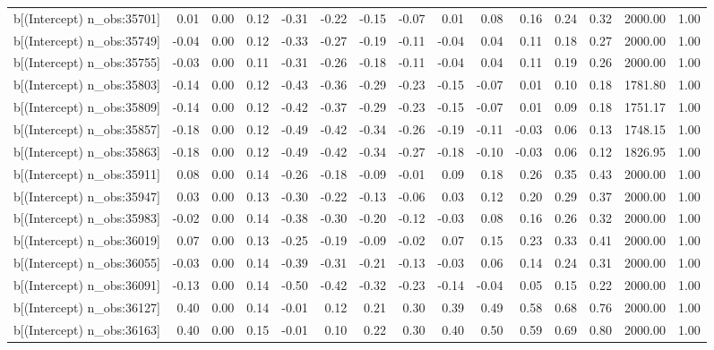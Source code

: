 \begin{table}[ht]
\begin{tabular}{rrrrrrrrrrrrrrr}
  b[(Intercept) n\_obs:35701] & 0.01 & 0.00 & 0.12 & -0.31 & -0.22 & -0.15 & -0.07 & 0.01 & 0.08 & 0.16 & 0.24 & 0.32 & 2000.00 & 1.00 \\ 
  b[(Intercept) n\_obs:35749] & -0.04 & 0.00 & 0.12 & -0.33 & -0.27 & -0.19 & -0.11 & -0.04 & 0.04 & 0.11 & 0.18 & 0.27 & 2000.00 & 1.00 \\ 
  b[(Intercept) n\_obs:35755] & -0.03 & 0.00 & 0.11 & -0.31 & -0.26 & -0.18 & -0.11 & -0.04 & 0.04 & 0.11 & 0.19 & 0.26 & 2000.00 & 1.00 \\ 
  b[(Intercept) n\_obs:35803] & -0.14 & 0.00 & 0.12 & -0.43 & -0.36 & -0.29 & -0.23 & -0.15 & -0.07 & 0.01 & 0.10 & 0.18 & 1781.80 & 1.00 \\ 
  b[(Intercept) n\_obs:35809] & -0.14 & 0.00 & 0.12 & -0.42 & -0.37 & -0.29 & -0.23 & -0.15 & -0.07 & 0.01 & 0.09 & 0.18 & 1751.17 & 1.00 \\ 
  b[(Intercept) n\_obs:35857] & -0.18 & 0.00 & 0.12 & -0.49 & -0.42 & -0.34 & -0.26 & -0.19 & -0.11 & -0.03 & 0.06 & 0.13 & 1748.15 & 1.00 \\ 
  b[(Intercept) n\_obs:35863] & -0.18 & 0.00 & 0.12 & -0.49 & -0.42 & -0.34 & -0.27 & -0.18 & -0.10 & -0.03 & 0.06 & 0.12 & 1826.95 & 1.00 \\ 
  b[(Intercept) n\_obs:35911] & 0.08 & 0.00 & 0.14 & -0.26 & -0.18 & -0.09 & -0.01 & 0.09 & 0.18 & 0.26 & 0.35 & 0.43 & 2000.00 & 1.00 \\ 
  b[(Intercept) n\_obs:35947] & 0.03 & 0.00 & 0.13 & -0.30 & -0.22 & -0.13 & -0.06 & 0.03 & 0.12 & 0.20 & 0.29 & 0.37 & 2000.00 & 1.00 \\ 
  b[(Intercept) n\_obs:35983] & -0.02 & 0.00 & 0.14 & -0.38 & -0.30 & -0.20 & -0.12 & -0.03 & 0.08 & 0.16 & 0.26 & 0.32 & 2000.00 & 1.00 \\ 
  b[(Intercept) n\_obs:36019] & 0.07 & 0.00 & 0.13 & -0.25 & -0.19 & -0.09 & -0.02 & 0.07 & 0.15 & 0.23 & 0.33 & 0.41 & 2000.00 & 1.00 \\ 
  b[(Intercept) n\_obs:36055] & -0.03 & 0.00 & 0.14 & -0.39 & -0.31 & -0.21 & -0.13 & -0.03 & 0.06 & 0.14 & 0.24 & 0.31 & 2000.00 & 1.00 \\ 
  b[(Intercept) n\_obs:36091] & -0.13 & 0.00 & 0.14 & -0.50 & -0.42 & -0.32 & -0.23 & -0.14 & -0.04 & 0.05 & 0.15 & 0.22 & 2000.00 & 1.00 \\ 
  b[(Intercept) n\_obs:36127] & 0.40 & 0.00 & 0.14 & -0.01 & 0.12 & 0.21 & 0.30 & 0.39 & 0.49 & 0.58 & 0.68 & 0.76 & 2000.00 & 1.00 \\ 
  b[(Intercept) n\_obs:36163] & 0.40 & 0.00 & 0.15 & -0.01 & 0.10 & 0.22 & 0.30 & 0.40 & 0.50 & 0.59 & 0.69 & 0.80 & 2000.00 & 1.00 \\ 

\end{tabular}
\end{table}
